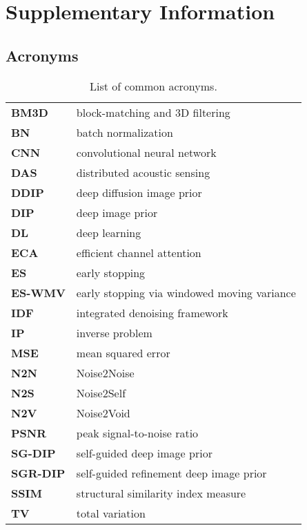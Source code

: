 \chapter{Supplementary Information}

\section{Acronyms}

\begin{table}[h!]
    \centering
    \begin{tabular}{ l l }
        \toprule
        \textbf{BM3D} & block-matching and 3D filtering \\
        \textbf{BN} & batch normalization \\
        \textbf{CNN} & convolutional neural network \\
        \textbf{DAS} & distributed acoustic sensing \\
        \textbf{DDIP} & deep diffusion image prior \\
        \textbf{DIP} & deep image prior \\
        \textbf{DL} & deep learning \\
        \textbf{ECA} & efficient channel attention \\
        \textbf{ES} & early stopping \\
        \textbf{ES-WMV} & early stopping via windowed moving variance \\
        \textbf{IDF} & integrated denoising framework \\
        \textbf{IP} & inverse problem \\
        \textbf{MSE} & mean squared error \\
        \textbf{N2N} & Noise2Noise \\
        \textbf{N2S} & Noise2Self \\
        \textbf{N2V} & Noise2Void \\
        \textbf{PSNR} & peak signal-to-noise ratio \\
        \textbf{SG-DIP} & self-guided deep image prior \\
        \textbf{SGR-DIP} & self-guided refinement deep image prior \\
        \textbf{SSIM} & structural similarity index measure \\
        \textbf{TV} & total variation \\
        \bottomrule
    \end{tabular}
    \caption{List of common acronyms.}
\end{table}

